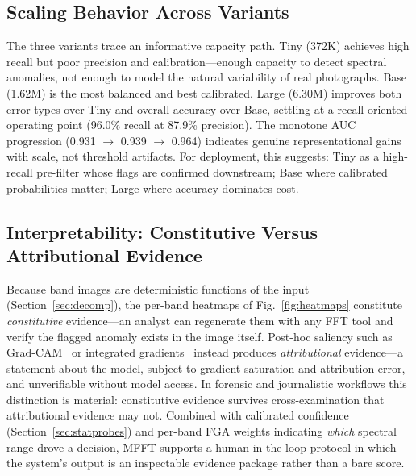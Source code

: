 \documentclass[journal]{IEEEtran}
\begin{document}
\subsection{Scaling Behavior Across Variants}
The three variants trace an informative capacity path. Tiny (372K) achieves high recall but poor precision and calibration---enough capacity to detect spectral anomalies, not enough to model the natural variability of real photographs. Base (1.62M) is the most balanced and best calibrated. Large (6.30M) improves both error types over Tiny and overall accuracy over Base, settling at a recall-oriented operating point (96.0\% recall at 87.9\% precision). The monotone AUC progression (0.931 $\rightarrow$ 0.939 $\rightarrow$ 0.964) indicates genuine representational gains with scale, not threshold artifacts. For deployment, this suggests: Tiny as a high-recall pre-filter whose flags are confirmed downstream; Base where calibrated probabilities matter; Large where accuracy dominates cost.

\subsection{Interpretability: Constitutive Versus Attributional Evidence}
\label{sec:interpretability}
Because band images are deterministic functions of the input (Section~\ref{sec:decomp}), the per-band heatmaps of Fig.~\ref{fig:heatmaps} constitute \emph{constitutive} evidence---an analyst can regenerate them with any FFT tool and verify the flagged anomaly exists in the image itself. Post-hoc saliency such as Grad-CAM~\cite{selvaraju2017} or integrated gradients~\cite{sundararajan2017} instead produces \emph{attributional} evidence---a statement about the model, subject to gradient saturation and attribution error, and unverifiable without model access. In forensic and journalistic workflows this distinction is material: constitutive evidence survives cross-examination that attributional evidence may not. Combined with calibrated confidence (Section~\ref{sec:statprobes}) and per-band FGA weights indicating \emph{which} spectral range drove a decision, MFFT supports a human-in-the-loop protocol in which the system's output is an inspectable evidence package rather than a bare score.
\end{document}
